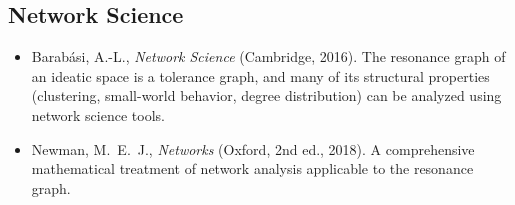\documentclass[11pt,openany]{book}
\theoremstyle{definition}
\theoremstyle{plain}
\theoremstyle{remark}
\begin{document}
\subsection{Network Science}

\begin{itemize}
\item Barabási, A.-L., \textit{Network Science} (Cambridge, 2016). The resonance graph of an ideatic space is a tolerance graph, and many of its structural properties (clustering, small-world behavior, degree distribution) can be analyzed using network science tools.
\item Newman, M.~E.~J., \textit{Networks} (Oxford, 2nd ed., 2018). A comprehensive mathematical treatment of network analysis applicable to the resonance graph.
\end{itemize}
\end{document}
